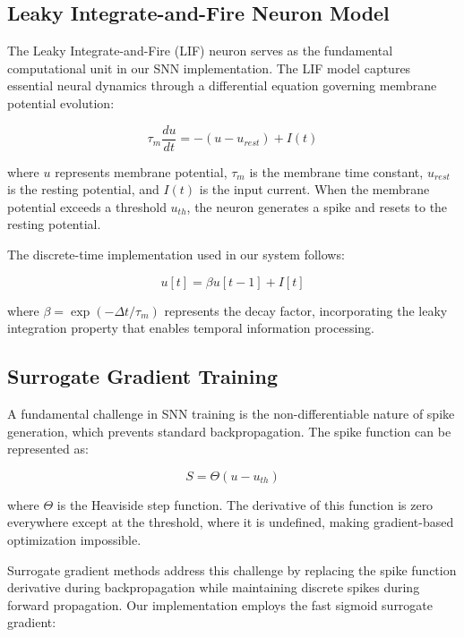 \documentclass[11pt]{article}
\begin{document}
\subsection{Leaky Integrate-and-Fire Neuron Model}

The Leaky Integrate-and-Fire (LIF) neuron serves as the fundamental computational unit in our SNN implementation. The LIF model captures essential neural dynamics through a differential equation governing membrane potential evolution:

\begin{equation}
\tau_m \frac{du}{dt} = -(u - u_{rest}) + I(t)
\end{equation}

where $u$ represents membrane potential, $\tau_m$ is the membrane time constant, $u_{rest}$ is the resting potential, and $I(t)$ is the input current. When the membrane potential exceeds a threshold $u_{th}$, the neuron generates a spike and resets to the resting potential.

The discrete-time implementation used in our system follows:

\begin{equation}
u[t] = \beta u[t-1] + I[t]
\end{equation}

where $\beta = \exp(-\Delta t / \tau_m)$ represents the decay factor, incorporating the leaky integration property that enables temporal information processing.

\subsection{Surrogate Gradient Training}

A fundamental challenge in SNN training is the non-differentiable nature of spike generation, which prevents standard backpropagation. The spike function can be represented as:

\begin{equation}
S = \Theta(u - u_{th})
\end{equation}

where $\Theta$ is the Heaviside step function. The derivative of this function is zero everywhere except at the threshold, where it is undefined, making gradient-based optimization impossible.

Surrogate gradient methods address this challenge by replacing the spike function derivative during backpropagation while maintaining discrete spikes during forward propagation. Our implementation employs the fast sigmoid surrogate gradient:
\end{document}
